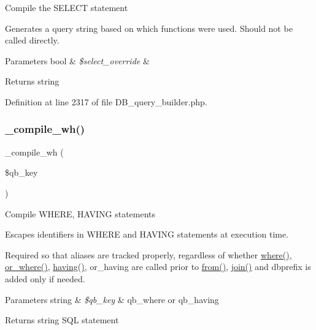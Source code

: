 Compile the S\+E\+L\+E\+CT statement

Generates a query string based on which functions were used. Should not be called directly.


\begin{DoxyParams}[1]{Parameters}
bool & {\em \$select\+\_\+override} & \\
\hline
\end{DoxyParams}
\begin{DoxyReturn}{Returns}
string 
\end{DoxyReturn}


Definition at line 2317 of file D\+B\+\_\+query\+\_\+builder.\+php.

\mbox{\label{class_c_i___d_b__query__builder_a3d2301b84734fd18a0db6d0602106f48}} 
\subsubsection{\texorpdfstring{\_compile\_wh()}{\_compile\_wh()}}
{\footnotesize\ttfamily \+\_\+compile\+\_\+wh (\begin{DoxyParamCaption}\item[{}]{\$qb\+\_\+key }\end{DoxyParamCaption})\hspace{0.3cm}{\ttfamily [protected]}}

Compile W\+H\+E\+RE, H\+A\+V\+I\+NG statements

Escapes identifiers in W\+H\+E\+RE and H\+A\+V\+I\+NG statements at execution time.

Required so that aliases are tracked properly, regardless of whether \mbox{\hyperlink{class_c_i___d_b__query__builder_a2356c4b7b93fb83c62a354a8a0748222}{where()}}, \mbox{\hyperlink{class_c_i___d_b__query__builder_a8d25e93a09f60fbe77541d0faef29bf0}{or\+\_\+where()}}, \mbox{\hyperlink{class_c_i___d_b__query__builder_af19efb51311e6f648a0035a0f94fceb6}{having()}}, or\+\_\+having are called prior to \mbox{\hyperlink{class_c_i___d_b__query__builder_a91f5f004ed8e2237a4decc5d23ac3457}{from()}}, \mbox{\hyperlink{class_c_i___d_b__query__builder_a54557b1ef757507cbbd2a8802a99810b}{join()}} and dbprefix is added only if needed.


\begin{DoxyParams}[1]{Parameters}
string & {\em \$qb\+\_\+key} & \textquotesingle{}qb\+\_\+where\textquotesingle{} or \textquotesingle{}qb\+\_\+having\textquotesingle{} \\
\hline
\end{DoxyParams}
\begin{DoxyReturn}{Returns}
string S\+QL statement 
\end{DoxyReturn}


